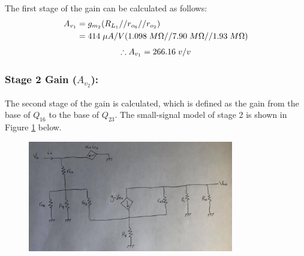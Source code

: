 \documentclass{article}
\begin{document}
	\pagebreak
	\noindent The first stage of the gain can be calculated as follows:
	\begin{align*}
		A_{v_1} &= g_{m_2} (R_{L_1} // r_{o_6} // r_{o_2})\\
		&= 414 \hspace{1mm} \mu A/V (1.098 \hspace{1mm} M\Omega // 7.90 \hspace{1mm} M\Omega // 1.93 \hspace{1mm} M\Omega)
	\end{align*}
	\begin{align*}
		\therefore A_{v_1} = 266.16 \hspace{1mm} v/v
	\end{align*}
	\subsubsection*{Stage 2 Gain ($A_{v_2}$):}
	The second stage of the gain is calculated, which is defined as the gain from the base of $Q_{16}$ to the base of $Q_{23}$.
	The small-signal model of stage 2 is shown in Figure \ref{f:4} below.
	\begin{figure}[!ht]
		\centering
		\includegraphics[width=0.8\textwidth]{ssm_gain2.png}
		\label{f:4}
	\end{figure}
\end{document}
